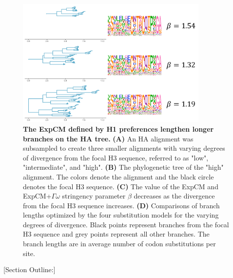 \documentclass[11pt]{article}
\newcommand\skhcomment[1]{{\color{cyan}[#1]}}
\begin{document}
\begin{figure}[H]
\centerline{\includegraphics[width=0.85\textwidth]{figures/doud_compete_2}}
\caption{\label{fig:doud_compete}
\textbf{The ExpCM defined by H1 preferences lengthen longer branches on the HA tree.} 
\textbf{(A)} An HA alignment was subsampled to create three smaller alignments with varying degrees of divergence from the focal H3 sequence, referred to as "low", "intermediate", and "high". 
\textbf{(B)} The phylogenetic tree of the "high" alignment. 
The colors denote the alignment and the black circle denotes the focal H3 sequence. 
\textbf{(C)} The value of the ExpCM and ExpCM+$\Gamma\omega$ stringency parameter $\beta$ decreases as the divergence from the focal H3 sequence increases. 
\textbf{(D)} Comparisons of branch lengths optimized by the four substitution models for the varying degrees of divergence. 
Black points represent branches from the focal H3 sequence and grey points represent all other branches.  
The branch lengths are in average number of codon substitutions per site. 
}
\end{figure}

\skhcomment{Section Outline:}
\end{document}
